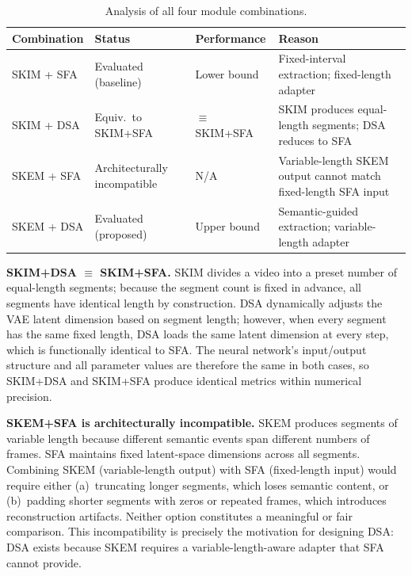 \documentclass[10pt,journal]{IEEEtran}
\begin{document}
\begin{table}[htbp]
\caption{Analysis of all four module combinations.
\label{tab:ablation_all}}
\begin{center}
\scriptsize
\renewcommand{\arraystretch}{1.3}
\begin{tabular}{|>{\centering\arraybackslash}m{1.7cm}
                |>{\centering\arraybackslash}m{1.8cm}
                |>{\centering\arraybackslash}m{1.5cm}
                |>{\centering\arraybackslash}m{2.6cm}|}
\hline
\textbf{Combination} & \textbf{Status} & \textbf{Performance} & \textbf{Reason} \\
\hline
SKIM + SFA & Evaluated (baseline) & Lower bound & Fixed-interval extraction; fixed-length adapter \\
\hline
SKIM + DSA & Equiv.\ to SKIM+SFA & $\equiv$ SKIM+SFA & SKIM produces equal-length segments; DSA reduces to SFA \\
\hline
SKEM + SFA & Architecturally incompatible & N/A & Variable-length SKEM output cannot match fixed-length SFA input \\
\hline
SKEM + DSA & Evaluated (proposed) & Upper bound & Semantic-guided extraction; variable-length adapter \\
\hline
\end{tabular}
\end{center}
\end{table}

\textbf{SKIM+DSA $\equiv$ SKIM+SFA.}
SKIM divides a video into a preset number of equal-length segments; because the segment count is fixed in advance, all segments have identical length by construction. DSA dynamically adjusts the VAE latent dimension based on segment length; however, when every segment has the same fixed length, DSA loads the same latent dimension at every step, which is functionally identical to SFA. The neural network's input/output structure and all parameter values are therefore the same in both cases, so SKIM+DSA and SKIM+SFA produce identical metrics within numerical precision.

\textbf{SKEM+SFA is architecturally incompatible.}
SKEM produces segments of variable length because different semantic events span different numbers of frames. SFA maintains fixed latent-space dimensions across all segments. Combining SKEM (variable-length output) with SFA (fixed-length input) would require either (a)~truncating longer segments, which loses semantic content, or (b)~padding shorter segments with zeros or repeated frames, which introduces reconstruction artifacts. Neither option constitutes a meaningful or fair comparison. This incompatibility is precisely the motivation for designing DSA: DSA exists because SKEM requires a variable-length-aware adapter that SFA cannot provide.
\end{document}

